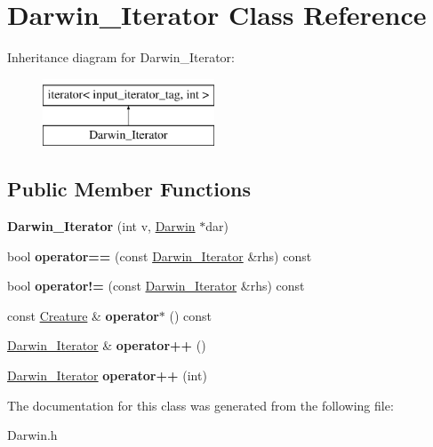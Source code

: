 \hypertarget{classDarwin__Iterator}{\section{Darwin\-\_\-\-Iterator Class Reference}
\label{classDarwin__Iterator}
}
Inheritance diagram for Darwin\-\_\-\-Iterator\-:\begin{figure}[H]
\begin{center}
\leavevmode
\includegraphics[height=2.000000cm]{classDarwin__Iterator}
\end{center}
\end{figure}
\subsection*{Public Member Functions}
\begin{DoxyCompactItemize}
\item 
\hypertarget{classDarwin__Iterator_a213a26bffa63a58803d96a13350acf28}{{\bfseries Darwin\-\_\-\-Iterator} (int v, \hyperlink{classDarwin}{Darwin} $\ast$dar)}\label{classDarwin__Iterator_a213a26bffa63a58803d96a13350acf28}

\item 
\hypertarget{classDarwin__Iterator_a6f7e8d9dd3d46d5e24e714cf63905a2c}{bool {\bfseries operator==} (const \hyperlink{classDarwin__Iterator}{Darwin\-\_\-\-Iterator} \&rhs) const }\label{classDarwin__Iterator_a6f7e8d9dd3d46d5e24e714cf63905a2c}

\item 
\hypertarget{classDarwin__Iterator_a1d4d68e28d1eee5c8361d8a38e9192f2}{bool {\bfseries operator!=} (const \hyperlink{classDarwin__Iterator}{Darwin\-\_\-\-Iterator} \&rhs) const }\label{classDarwin__Iterator_a1d4d68e28d1eee5c8361d8a38e9192f2}

\item 
\hypertarget{classDarwin__Iterator_aa36cdd2af8ed99f148feaf0fb36afee3}{const \hyperlink{classCreature}{Creature} \& {\bfseries operator$\ast$} () const }\label{classDarwin__Iterator_aa36cdd2af8ed99f148feaf0fb36afee3}

\item 
\hypertarget{classDarwin__Iterator_a19c7a708eb76cae5b6ad345a80702380}{\hyperlink{classDarwin__Iterator}{Darwin\-\_\-\-Iterator} \& {\bfseries operator++} ()}\label{classDarwin__Iterator_a19c7a708eb76cae5b6ad345a80702380}

\item 
\hypertarget{classDarwin__Iterator_a4dbff05c6e280513fc8a09093409afa5}{\hyperlink{classDarwin__Iterator}{Darwin\-\_\-\-Iterator} {\bfseries operator++} (int)}\label{classDarwin__Iterator_a4dbff05c6e280513fc8a09093409afa5}

\end{DoxyCompactItemize}


The documentation for this class was generated from the following file\-:\begin{DoxyCompactItemize}
\item 
Darwin.\-h\end{DoxyCompactItemize}
